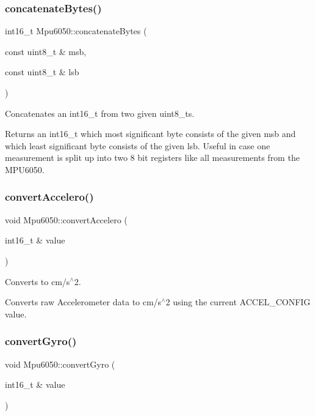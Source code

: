 \subsubsection{\texorpdfstring{concatenate\+Bytes()}{concatenateBytes()}}
{\footnotesize\ttfamily int16\+\_\+t Mpu6050\+::concatenate\+Bytes (\begin{DoxyParamCaption}\item[{const uint8\+\_\+t \&}]{msb,  }\item[{const uint8\+\_\+t \&}]{lsb }\end{DoxyParamCaption})\hspace{0.3cm}{\ttfamily [virtual]}}



Concatenates an int16\+\_\+t from two given uint8\+\_\+t\textquotesingle{}s. 

Returns an int16\+\_\+t which most significant byte consists of the given msb and which least significant byte consists of the given lsb. Useful in case one measurement is split up into two 8 bit registers like all measurements from the M\+P\+U6050. \mbox{\label{classMpu6050_ac7d9ff1fd682cf54eac232532eabd5ba}} 
\subsubsection{\texorpdfstring{convert\+Accelero()}{convertAccelero()}}
{\footnotesize\ttfamily void Mpu6050\+::convert\+Accelero (\begin{DoxyParamCaption}\item[{int16\+\_\+t \&}]{value }\end{DoxyParamCaption})\hspace{0.3cm}{\ttfamily [virtual]}}



Converts to cm/s$^\wedge$2. 

Converts raw Accelerometer data to cm/s$^\wedge$2 using the current A\+C\+C\+E\+L\+\_\+\+C\+O\+N\+F\+IG value. \mbox{\label{classMpu6050_ab664732bd9c7d6ce8034eac6d93987fa}} 
\subsubsection{\texorpdfstring{convert\+Gyro()}{convertGyro()}}
{\footnotesize\ttfamily void Mpu6050\+::convert\+Gyro (\begin{DoxyParamCaption}\item[{int16\+\_\+t \&}]{value }\end{DoxyParamCaption})\hspace{0.3cm}{\ttfamily [virtual]}}




